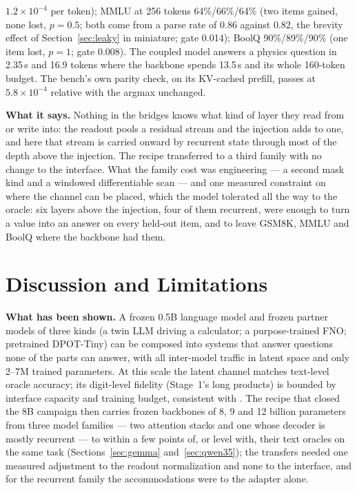 \documentclass[11pt]{article}
\begin{document}
$1.2\times10^{-4}$ per token); MMLU at 256 tokens 64\%/66\%/64\% (two items gained, none lost, $p = 0.5$; both come from a parse rate of 0.86 against 0.82, the brevity effect of Section~\ref{sec:leaky} in miniature; gate 0.014); BoolQ 90\%/89\%/90\% (one item lost, $p = 1$; gate 0.008). The coupled model answers a physics question in 2.35\,s and 16.9 tokens where the backbone spends 13.5\,s and its whole 160-token budget. The bench's own parity check, on its KV-cached prefill, passes at $5.8\times10^{-4}$ relative with the argmax unchanged.

\textbf{What it says.} Nothing in the bridges knows what kind of layer they read from or write into: the readout pools a residual stream and the injection adds to one, and here that stream is carried onward by recurrent state through most of the depth above the injection. The recipe transferred to a third family with no change to the interface. What the family cost was engineering --- a second mask kind and a windowed differentiable scan --- and one measured constraint on where the channel can be placed, which the model tolerated all the way to the oracle: six layers above the injection, four of them recurrent, were enough to turn a value into an answer on every held-out item, and to leave GSM8K, MMLU and BoolQ where the backbone had them.

\section{Discussion and Limitations}
\label{sec:discussion}

\textbf{What has been shown.} A frozen 0.5B language model and frozen partner models of three kinds (a twin LLM driving a calculator; a purpose-trained FNO; pretrained DPOT-Tiny) can be composed into systems that answer questions none of the parts can answer, with all inter-model traffic in latent space and only 2--7M trained parameters. At this scale the latent channel matches text-level oracle accuracy; its digit-level fidelity (Stage~1's long products) is bounded by interface capacity and training budget, consistent with \citet{flamant2026bicameral}. The recipe that closed the 8B campaign then carries frozen backbones of 8, 9 and 12 billion parameters from three model families --- two attention stacks and one whose decoder is mostly recurrent --- to within a few points of, or level with, their text oracles on the same task (Sections~\ref{sec:gemma} and~\ref{sec:qwen35}); the transfers needed one measured adjustment to the readout normalization and none to the interface, and for the recurrent family the accommodations were to the adapter alone.
\end{document}
